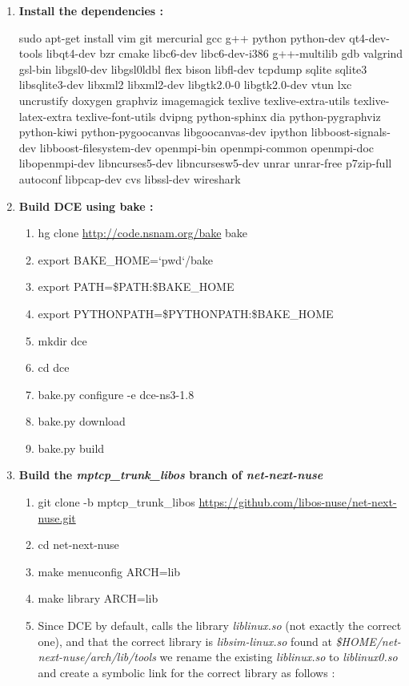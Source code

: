 \documentclass[a4paper,11pt]{article}
\begin{document}
		\begin{enumerate}
			\sloppy
			\item \textbf{Install the dependencies :}
				
			\nohyphens{
				sudo apt-get install vim git mercurial gcc g++ python python-dev qt4-dev-tools libqt4-dev bzr cmake libc6-dev libc6-dev-i386 g++-multilib gdb valgrind gsl-bin libgsl0-dev libgsl0ldbl flex bison libfl-dev tcpdump sqlite sqlite3 libsqlite3-dev libxml2 libxml2-dev libgtk2.0-0 libgtk2.0-dev vtun lxc uncrustify doxygen graphviz imagemagick texlive texlive-extra-utils texlive-latex-extra texlive-font-utils dvipng python-sphinx dia python-pygraphviz python-kiwi python-pygoocanvas libgoocanvas-dev ipython libboost-signals-dev libboost-filesystem-dev openmpi-bin openmpi-common openmpi-doc libopenmpi-dev libncurses5-dev libncursesw5-dev unrar unrar-free p7zip-full autoconf libpcap-dev cvs libssl-dev wireshark}

			\item \textbf{Build DCE using bake :}

				\begin{enumerate}

					\item hg clone \url{http://code.nsnam.org/bake} bake
					\item export BAKE\_HOME=`pwd`/bake
					\item export PATH=\$PATH:\$BAKE\_HOME
					\item export PYTHONPATH=\$PYTHONPATH:\$BAKE\_HOME
					\item mkdir dce
					\item cd dce
					\item bake.py configure -e dce-ns3-1.8
					\item bake.py download
					\item bake.py build

				\end{enumerate}

			\item \textbf{Build the \emph{mptcp\_trunk\_libos} branch of \emph{net-next-nuse}}
				\begin{enumerate}

					\item git clone -b mptcp\_trunk\_libos \url{https://github.com/libos-nuse/net-next-nuse.git}
					\item cd net-next-nuse
					\item make menuconfig ARCH=lib
					\item make library ARCH=lib
					\item Since DCE by default, calls the library \emph{liblinux.so} (not exactly the correct one), and that the correct library is \emph{libsim-linux.so} found at \emph{\$HOME/net-next-nuse/arch/lib/tools} we rename the existing \emph{liblinux.so} to \emph{liblinux0.so} and create a symbolic link for the correct library as follows :


\end{enumerate}
\end{enumerate}
\end{document}
